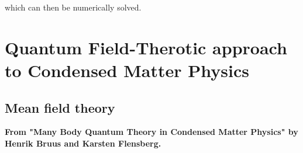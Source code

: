 \documentclass{homework}
\begin{document}
which can then be numerically solved. 

\clearpage 




    

%

\clearpage 

\section{Quantum Field-Therotic approach to Condensed Matter Physics}

\subsection{Mean field theory}

\textbf{From "Many Body Quantum Theory in Condensed Matter Physics" by Henrik Bruus and Karsten Flensberg.}
\end{document}
